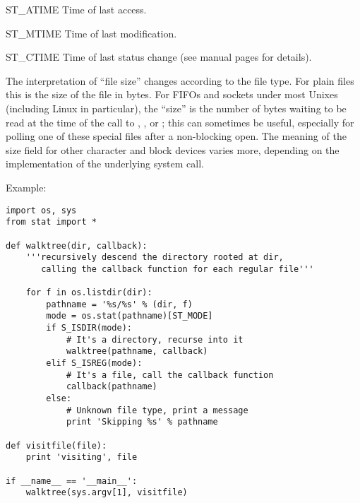 \begin{datadesc}{ST_ATIME}
Time of last access.
\end{datadesc}

\begin{datadesc}{ST_MTIME}
Time of last modification.
\end{datadesc}

\begin{datadesc}{ST_CTIME}
Time of last status change (see manual pages for details).
\end{datadesc}

The interpretation of ``file size'' changes according to the file
type.  For plain files this is the size of the file in bytes.  For
FIFOs and sockets under most Unixes (including Linux in particular),
the ``size'' is the number of bytes waiting to be read at the time of
the call to , , or
; this can sometimes be useful, especially for
polling one of these special files after a non-blocking open.  The
meaning of the size field for other character and block devices varies
more, depending on the implementation of the underlying system call.

Example:

\begin{verbatim}
import os, sys
from stat import *

def walktree(dir, callback):
    '''recursively descend the directory rooted at dir,
       calling the callback function for each regular file'''

    for f in os.listdir(dir):
        pathname = '%s/%s' % (dir, f)
        mode = os.stat(pathname)[ST_MODE]
        if S_ISDIR(mode):
            # It's a directory, recurse into it
            walktree(pathname, callback)
        elif S_ISREG(mode):
            # It's a file, call the callback function
            callback(pathname)
        else:
            # Unknown file type, print a message
            print 'Skipping %s' % pathname

def visitfile(file):
    print 'visiting', file

if __name__ == '__main__':
    walktree(sys.argv[1], visitfile)
\end{verbatim}
